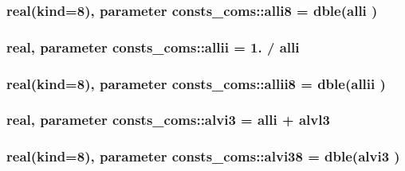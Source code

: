 \subsubsection[{\texorpdfstring{alli8}{alli8}}]{\setlength{\rightskip}{0pt plus 5cm}real(kind=8), parameter consts\+\_\+coms\+::alli8 = dble({\bf alli} )}\hypertarget{namespaceconsts__coms_acc1b8962e7dd43281926417aa95561f7}{}\label{namespaceconsts__coms_acc1b8962e7dd43281926417aa95561f7}
\subsubsection[{\texorpdfstring{allii}{allii}}]{\setlength{\rightskip}{0pt plus 5cm}real, parameter consts\+\_\+coms\+::allii = 1. / {\bf alli}}\hypertarget{namespaceconsts__coms_a4fd9b42d0269a2878dee9276cab091c5}{}\label{namespaceconsts__coms_a4fd9b42d0269a2878dee9276cab091c5}
\subsubsection[{\texorpdfstring{allii8}{allii8}}]{\setlength{\rightskip}{0pt plus 5cm}real(kind=8), parameter consts\+\_\+coms\+::allii8 = dble({\bf allii} )}\hypertarget{namespaceconsts__coms_a0d860a9c3e3614a0129bb0eeb22387e6}{}\label{namespaceconsts__coms_a0d860a9c3e3614a0129bb0eeb22387e6}
\subsubsection[{\texorpdfstring{alvi3}{alvi3}}]{\setlength{\rightskip}{0pt plus 5cm}real, parameter consts\+\_\+coms\+::alvi3 = {\bf alli} + {\bf alvl3}}\hypertarget{namespaceconsts__coms_aa133e21cddffbe4c7673ae73771a15bb}{}\label{namespaceconsts__coms_aa133e21cddffbe4c7673ae73771a15bb}
\subsubsection[{\texorpdfstring{alvi38}{alvi38}}]{\setlength{\rightskip}{0pt plus 5cm}real(kind=8), parameter consts\+\_\+coms\+::alvi38 = dble({\bf alvi3} )}\hypertarget{namespaceconsts__coms_a93d2577c7a09eea29f032257a759bef3}{}\label{namespaceconsts__coms_a93d2577c7a09eea29f032257a759bef3}
